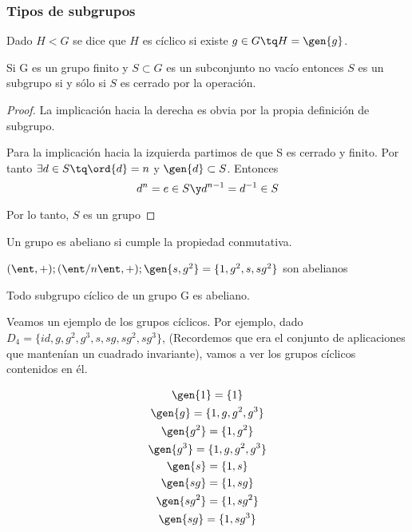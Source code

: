 \documentclass[nochap]{apuntes}
\begin{document}
\subsubsection{Tipos de subgrupos}
\begin{defn}
   Dado $H<G$ se dice que $H$ es cíclico si existe $g\in G \tq H=\gen{g}$.
  \end{defn}

  \begin{theorem}
   Si G es un grupo finito y $S\subset G$ es un subconjunto no vacío entonces $S$ es un subgrupo si y sólo si $S$ es cerrado por la operación.
  \end{theorem}

  \begin{proof}
   La implicación hacia la derecha es obvia por la propia definición de subgrupo.

   Para la implicación hacia la izquierda partimos de que S es cerrado y finito. Por tanto $\exists d \in S \tq \ord{d}=n$ y $\gen{d} \subset S$. Entonces
\[ d^{n}=e\in S \y d^{n-1}=d^{-1}\in S\]

Por lo tanto, $S$ es un grupo
  \end{proof}

  \begin{defn}
   Un grupo es abeliano si cumple la propiedad conmutativa.
  \end{defn}

  \begin{example}  $(\ent, +); (\ent/n\ent, +); \gen{s,g^{2}} =\{1,g^{2},s,sg^{2}\}$ son abelianos
  \end{example}

  \begin{lemma}
   Todo subgrupo cíclico de un grupo G es abeliano.
  \end{lemma}

Veamos un ejemplo de los grupos cíclicos. Por ejemplo, dado $D_{4}=\{id, g, g^{2}, g^{3}, s, sg, sg^{2},sg^{3}\}$, (Recordemos que era el conjunto de aplicaciones que mantenían un cuadrado invariante), vamos a ver los grupos cíclicos contenidos en él.

  \begin{gather*}
  \gen{1}=\{1\} \\
  \gen{g} =\{1,g,g^{2}, g^{3}\}\\
  \gen{g^{2}}=\{1,g^{2}\}\\
  \gen{g^{3}}=\{1,g, g^{2}, g^{3}\}\\
  \gen{s} =\{1,s\}\\
  \gen{sg}=\{1, sg\}\\
  \gen{sg^{2}} =\{1, sg^{2}\}\\
  \gen{sg}=\{1, sg^{3}\}
  \end{gather*}
\end{document}
